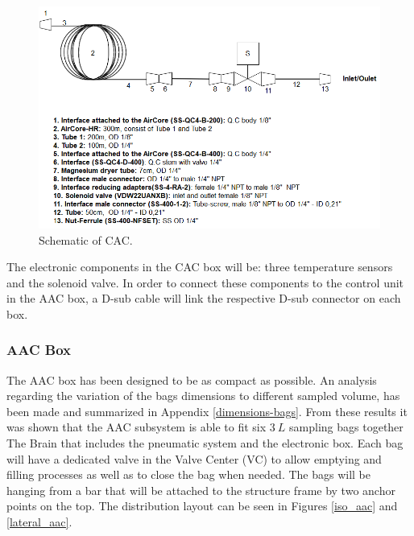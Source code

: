 \begin{figure}[H]
    \centering
    \includegraphics[width=1\textwidth]{4-experiment-design/img/Mechanical/CAC-schematic.PNG}
    \caption{Schematic of CAC.}
    \label{fig:CAC-schematic}
\end{figure}
\smallskip
The electronic components in the CAC box will be: three temperature sensors and the solenoid valve. In order to connect these components to the control unit in the AAC box, a D-sub cable will link the respective D-sub connector on each box.

\subsubsection{AAC Box}\label{sec:aac-analysis}
The AAC box has been designed to be as compact as possible. An analysis regarding the variation of the bags dimensions to different sampled volume, has been made and summarized in Appendix \ref{dimensions-bags}. From these results it was shown that the AAC subsystem is able to fit six $3\ L$ sampling bags together The Brain that includes the pneumatic system and the electronic box. Each bag will have a dedicated valve in the Valve Center (VC) to allow emptying and filling processes as well as to close the bag when needed. The bags will be hanging from a bar that will be attached to the structure frame by two anchor points on the top. The distribution layout can be seen in Figures \ref{iso_aac} and \ref{lateral_aac}. 
 


